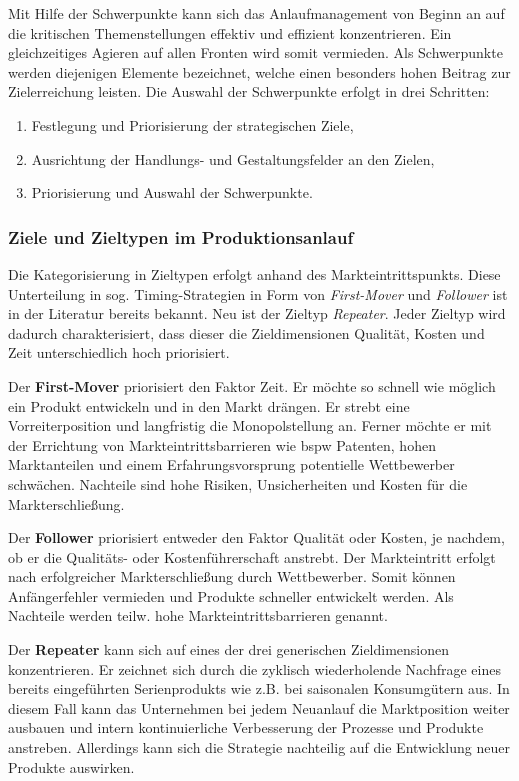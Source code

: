 Mit Hilfe der Schwerpunkte kann sich das Anlaufmanagement von Beginn an auf die kritischen Themenstellungen effektiv und effizient konzentrieren. Ein gleichzeitiges Agieren auf allen Fronten wird somit vermieden. Als Schwerpunkte werden diejenigen Elemente bezeichnet, welche einen besonders hohen Beitrag zur Zielerreichung leisten. 
Die Auswahl der Schwerpunkte erfolgt in drei Schritten: 
\begin{enumerate}
 \item Festlegung und Priorisierung der strategischen Ziele,
 \item Ausrichtung der Handlungs- und Gestaltungsfelder an den Zielen,
 \item Priorisierung und Auswahl der Schwerpunkte.
\end{enumerate}

\subsubsection{Ziele und Zieltypen im Produktionsanlauf}
Die Kategorisierung in Zieltypen erfolgt anhand des Markteintrittspunkts. Diese Unterteilung in sog. Timing-Strategien in Form von \textit{First-Mover} und \textit{Follower} ist in der Literatur bereits bekannt. Neu ist der Zieltyp \textit{Repeater}. Jeder Zieltyp wird dadurch charakterisiert, dass dieser die Zieldimensionen Qualität, Kosten und Zeit unterschiedlich hoch priorisiert. 

Der \textbf{First-Mover} priorisiert den Faktor Zeit. Er möchte so schnell wie möglich ein Produkt entwickeln und in den Markt drängen. Er strebt eine Vorreiterposition und langfristig die Monopolstellung an. Ferner möchte er mit der Errichtung von Markteintrittsbarrieren wie \gls{bspw} Patenten, hohen Marktanteilen und einem Erfahrungsvorsprung potentielle Wettbewerber schwächen. 
Nachteile sind hohe Risiken, Unsicherheiten und Kosten für die Markterschließung. 

Der \textbf{Follower} priorisiert entweder den Faktor Qualität oder Kosten, je nachdem, ob er die Qualitäts- oder Kostenführerschaft anstrebt. Der Markteintritt erfolgt nach erfolgreicher Markterschließung durch Wettbewerber. Somit können Anfängerfehler vermieden und Produkte schneller entwickelt werden. Als Nachteile werden teilw. hohe Markteintrittsbarrieren genannt. 

Der \textbf{Repeater} kann sich auf eines der drei generischen Zieldimensionen konzentrieren. Er zeichnet sich durch die zyklisch wiederholende Nachfrage eines bereits eingeführten Serienprodukts wie z.B. bei saisonalen Konsumgütern aus. In diesem Fall kann das Unternehmen bei jedem Neuanlauf die Marktposition weiter ausbauen und intern kontinuierliche Verbesserung der Prozesse und Produkte anstreben. Allerdings kann sich die Strategie nachteilig auf die Entwicklung neuer Produkte auswirken. 

